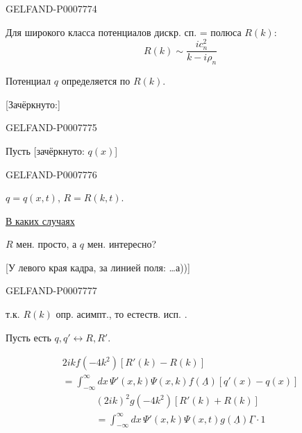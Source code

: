 \begin{GelfandAdjacentEvidence}{GELFAND-P000777}{4}


Для широкого класса потенциалов дискр. сп. = полюса \(R(k)\):
\begin{equation}
R(k)\sim\frac{ic_n^2}{k-i\rho_n}\tag{4}
\end{equation}

Потенциал \(q\) определяется по \(R(k)\).

[Зачёркнуто:]
\end{GelfandAdjacentEvidence}
\begin{GelfandAdjacentEvidence}{GELFAND-P000777}{5}


Пусть [зачёркнуто: \(q(x)\)]
\end{GelfandAdjacentEvidence}
\begin{GelfandAdjacentEvidence}{GELFAND-P000777}{6}

\(q=q(x,t)\), \(R=R(k,t)\).

\underline{В каких случаях}

\(R\) мен. просто, а \(q\) мен. интересно?

[У левого края кадра, за линией поля: …а))]
\end{GelfandAdjacentEvidence}
\begin{GelfandAdjacentEvidence}{GELFAND-P000777}{7}


 т.к. \(R(k)\) опр. асимпт., то естеств. исп. .

 Пусть есть \(q,q'\longleftrightarrow R,R'\).

\begin{multline}
2ikf(-4k^2)[R'(k)-R(k)]\\
=\int_{-\infty}^{\infty}dx\,\Psi'(x,k)\Psi(x,k)f(\underline\Lambda)[q'(x)-q(x)]\tag{5}
\end{multline}
\begin{multline}
(2ik)^2g(-4k^2)[R'(k)+R(k)]\\
=\int_{-\infty}^{\infty}dx\,\Psi'(x,k)\Psi(x,t)g(\underline\Lambda)\underline\Gamma\cdot1\tag{6}
\end{multline}
\end{GelfandAdjacentEvidence}



